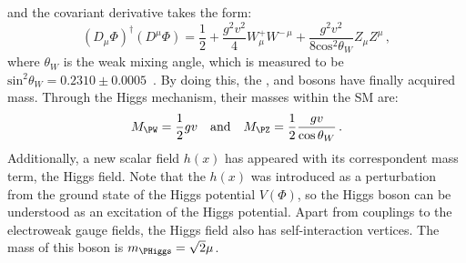 and the covariant derivative takes the form:
\begin{equation*}
	(D_{\mu} \Phi)^{\dagger}(D^{\mu} \Phi) = \frac{1}{2}+\frac{g^2v^2}{4}W^{+}_{\mu} W^{-\, \mu} + \frac{g^{2} v^{2}}{8 \textrm{cos}^{2}\theta_{W}}Z_{\mu}Z^{\mu} \, , %
\end{equation*}
where $\theta_{W}$ is the weak mixing angle, which is measured to be 
\mbox{$\textrm{sin}^{2} \theta_{W} = 0.2310\pm0.0005$}~\cite{CMS:2018ktx}.
By doing this, the \PWplus, \PWminus and \PZ bosons have finally acquired mass. Through the Higgs mechanism, their masses within the SM are:
\begin{align*}
	M_{\PW} = \frac{1}{2}gv 	&&  	\text{and}	&& M_{\PZ} = \frac{1}{2}\frac{gv}{\textrm{cos}\,\theta_{W}}\, .
\end{align*}
Additionally, a new scalar field $h(x)$ has appeared with its correspondent mass term, the Higgs field. Note that the $h(x)$ was introduced as a perturbation from the ground
state of the Higgs potential $V(\Phi)$, so the Higgs boson can be understood as an excitation of the Higgs potential. Apart from couplings to the electroweak gauge
fields, the Higgs field also has self-interaction vertices. The mass of this boson is $m_{\PHiggs}=\sqrt{2}\mu$.

